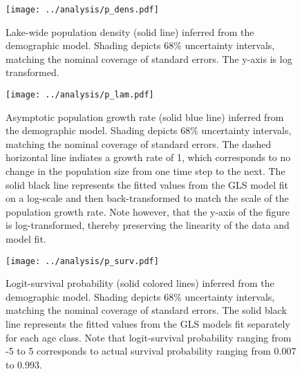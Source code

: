 \documentclass[11pt]{article}
\begin{document}
\clearpage
\begin{figure}
\centering
\texttt{[image: ../analysis/p\_dens.pdf]}
\caption{\label{fig:p_dens}
Lake-wide population density (solid line) inferred from the demographic model.
Shading depicts 68\% uncertainty intervals, 
matching the nominal coverage of standard errors.
The y-axis is log transformed.
}
\end{figure}
\clearpage

\clearpage
\begin{figure}
\centering
\texttt{[image: ../analysis/p\_lam.pdf]}
\caption{\label{fig:p_lam}
Asymptotic population growth rate (solid blue line) inferred from the demographic model.
Shading depicts 68\% uncertainty intervals, 
matching the nominal coverage of standard errors.
The dashed horizontal line indiates a growth rate of 1,
which corresponds to no change in the population size from one time step to the next.
The solid black line represents the fitted values from the GLS model
fit on a log-scale and then back-transformed 
to match the scale of the population growth rate.
Note however, that the y-axis of the figure is log-transformed, 
thereby preserving the linearity of the data and model fit.
}
\end{figure}
\clearpage

\clearpage
\begin{figure}
\centering
\texttt{[image: ../analysis/p\_surv.pdf]}
\caption{\label{fig:p_surv}
Logit-survival probability (solid colored lines) inferred from the demographic model.
Shading depicts 68\% uncertainty intervals, 
matching the nominal coverage of standard errors.
The solid black line represents the fitted values from the GLS models
fit separately for each age class.
Note that logit-survival probability ranging from -5 to 5 
corresponds to actual survival probability ranging from 0.007 to 0.993.
}
\end{figure}
\clearpage
\end{document}
